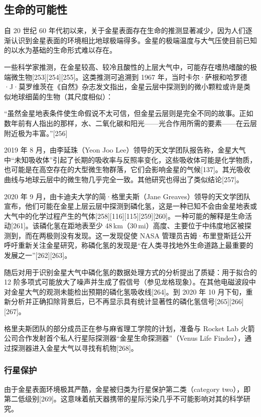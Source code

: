 \subsection{生命的可能性}
自 20 世纪 60 年代初以来，关于金星表面存在生命的推测显著减少，因为人们逐渐认识到金星表面的环境相比地球极端得多。金星的极端温度与大气压使目前已知的以水为基础的生命形式难以存在。

一些科学家推测，在金星较高、较冷且酸性的上层大气中，可能存在嗜热嗜酸的极端微生物[253][254][255]。这类推测可追溯到 1967 年，当时卡尔·萨根和哈罗德·J·莫罗维茨在《自然》杂志发文指出，金星云层中探测到的微小颗粒或许是类似地球细菌的生物（其尺度相似）：

“虽然金星地表条件使生命假说不太可信，但金星云层则是完全不同的故事。正如数年前有人指出的那样，水、二氧化碳和阳光——光合作用所需的要素——在云层附近极为丰富。”[256]

2019 年 8 月，由李延珠（Yeon Joo Lee）领导的天文学团队报告称，金星大气中“未知吸收体”引起了长期的吸收率与反照率变化，这些吸收体可能是化学物质，也可能是在高空存在的大型微生物群落，它们会影响金星的气候[137]。其光吸收曲线与地球云层中的微生物几乎完全一致。其他研究也得出了类似结论[257]。

2020 年 9 月，由卡迪夫大学的简·格里夫斯（Jane Greaves）领导的天文学团队宣布，他们可能在金星上层云层中探测到磷化氢，这是一种已知不会由金星地表或大气中的化学过程产生的气体[258][116][115][259][260]。一种可能的解释是生命活动[261]。该磷化氢在距地表至少 48\,km（30\,mi）高度、主要位于中纬度地区被探测到，而在两极则没有发现。这一发现促使 NASA 管理员吉姆·布里登斯廷公开呼吁重新关注金星研究，称磷化氢的发现是“在人类寻找地外生命道路上最重要的发展之一”[262][263]。

随后对用于识别金星大气中磷化氢的数据处理方式的分析提出了质疑：用于拟合的 12 阶多项式可能放大了噪声并生成了假信号（参见龙格现象）。在其他电磁波段中对金星大气的观测未能检出预期的磷化氢吸收线[264]。到 2020 年 10 月下旬，重新分析并正确扣除背景后，已不再显示具有统计显著性的磷化氢信号[265][266][267]。

格里夫斯团队的部分成员正在参与麻省理工学院的计划，准备与 Rocket Lab 火箭公司合作发射首个私人行星际探测器“金星生命探测器”（Venus Life Finder），通过探测器进入金星大气以寻找有机物[268]。
\subsubsection{行星保护}
由于金星表面环境极其严酷，金星被归类为行星保护第二类（category two），即第二低级别[269]。这意味着航天器携带的星际污染几乎不可能影响对其的科学研究。

